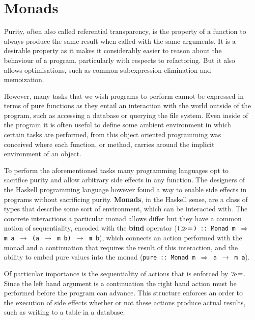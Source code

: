 \section{Monads}

\label{sec:monads}

Purity, often also called referential transparency, is the property of
a function to always produce the same result when called with the same
arguments. It is a desirable property as it makes it considerably
easier to reason about the behaviour of a program, particularly with
respects to refactoring. But it also allows optimisations, such as
common subexpression elimination and memoization.

However, many tasks that we wish programs to perform cannot be
expressed in terms of pure functions as they entail an interaction
with the world outside of the program, such as accessing a database or
querying the file system. Even inside of the program it is often
useful to define some ambient environment in which certain tasks are
performed, from this object oriented programming was conceived where
each function, or method, carries around the implicit environment of
an object.

To perform the aforementioned tasks many programming languages opt to sacrifice
purity and allow arbitrary side effects in any function. The designers of the
Haskell programming language however found a way to enable side effects in
programs without sacrificing purity. \textbf{Monads}, in the Haskell sense, are
a class of types that describe some sort of environment, which can be interacted
with. The concrete interactions a particular monad allows differ but they have a
common notion of sequentiality, encoded with the \textbf{bind} operator
(\texttt{($\gg=$) :: Monad m $\Rightarrow$ m a $\rightarrow$ (a $\rightarrow$
  m b) $\rightarrow$ m b}), which connects an action performed with the monad
and a continuation that requires the result of this interaction, and the ability
to embed pure values into the monad (\texttt{pure :: Monad m $\Rightarrow$ a
  $\rightarrow$ m a}).

Of particular importance is the sequentiality of actions that is enforced by
$\gg=$. Since the left hand argument is a continuation the right hand action
must be performed before the program can advance. This structure enforces an
order to the execution of side effects whether or not these actions produce
actual results, such as writing to a table in a database.

